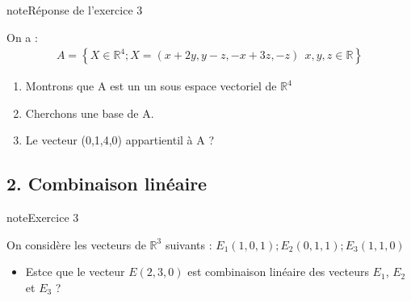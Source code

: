 \documentclass[letterpaper,10pt,french]{jupyterBook}
\begin{document}
\begin{sphinxadmonition}{note}{Réponse de l’exercice 3}

\sphinxAtStartPar
On a :
\begin{equation*}
\begin{split}
A = \left\{ X \in \mathbb{R}^4 ; X= (x+2y,y-z, -x+3z,-z)~~ x,y,z \in \mathbb{R} \right\}
\end{split}
\end{equation*}\begin{enumerate}
%
\item {} 
\sphinxAtStartPar
Montrons que A est un un sous espace vectoriel de \(\mathbb{R}^4\)

\item {} 
\sphinxAtStartPar
Cherchons une base de A.

\item {} 
\sphinxAtStartPar
Le vecteur (0,1,\sphinxhyphen{}4,0) appartient\sphinxhyphen{}il à A ?

\end{enumerate}
\end{sphinxadmonition}


\subsection{2. Combinaison linéaire}
\label{\detokenize{S_xe9rie1:combinaison-lineaire}}
\begin{sphinxadmonition}{note}{Exercice 3}

\sphinxAtStartPar
On considère les vecteurs de \(\mathbb{R}^3\) suivants :
\(
E_1(1,0,1) ; E_2(0,1,1) ; E_3(1,1,0)
\)
\begin{itemize}
\item {} 
\sphinxAtStartPar
Est\sphinxhyphen{}ce que le vecteur \(E\)\((2,3,0)\) est combinaison linéaire des vecteurs \(E_1\), \(E_2\) et \(E_3\) ?

\end{itemize}
\end{sphinxadmonition}
\end{document}

